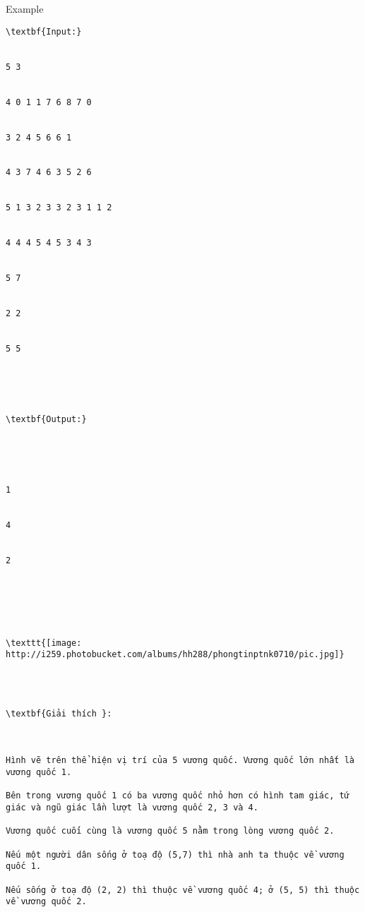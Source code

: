 Example
\begin{verbatim}
\textbf{Input:}


5 3


4 0 1 1 7 6 8 7 0


3 2 4 5 6 6 1


4 3 7 4 6 3 5 2 6


5 1 3 2 3 3 2 3 1 1 2


4 4 4 5 4 5 3 4 3


5 7


2 2


5 5





\textbf{Output:}





1


4


2






\texttt{[image: http://i259.photobucket.com/albums/hh288/phongtinptnk0710/pic.jpg]}




\textbf{Giải thích }: 

 

Hình vẽ trên thể hiện vị trí của 5 vương quốc. Vương quốc lớn nhất là vương quốc 1. 

Bên trong vương quốc 1 có ba vương quốc nhỏ hơn có hình tam giác, tứ giác và ngũ giác lần lượt là vương quốc 2, 3 và 4.

Vương quốc cuối cùng là vương quốc 5 nằm trong lòng vương quốc 2. 

Nếu một người dân sống ở toạ độ (5,7) thì nhà anh ta thuộc về vương quốc 1. 

Nếu sống ở toạ độ (2, 2) thì thuộc về vương quốc 4; ở (5, 5) thì thuộc về vương quốc 2.\end{verbatim}